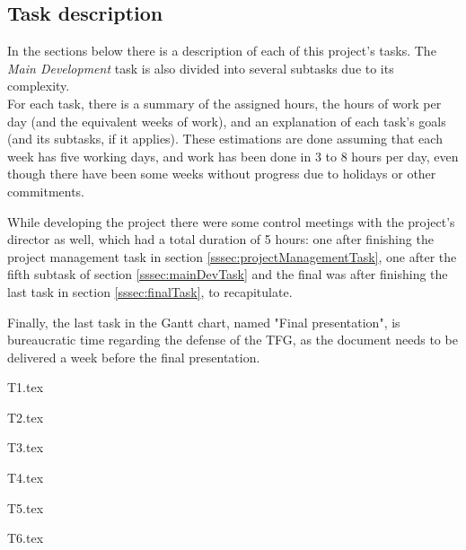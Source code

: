 \subsection{Task description}
\label{ssec:tasks}
In the sections below there is a description of each of this project's tasks. The \textit{Main Development} task is also divided into several subtasks due to its complexity.\\
For each task, there is a summary of the assigned hours, the hours of work per day (and the equivalent weeks of work), and an explanation of each task's goals (and its subtasks, if it applies). These estimations are done assuming that each week has five working days, and work has been done in 3 to 8 hours per day, even though there have been some weeks without progress due to holidays or other commitments.

While developing the project there were some control meetings with the project's director as well, which had a total duration of 5 hours: one after finishing the project management task in section \ref{sssec:projectManagementTask}, one after the fifth subtask of section \ref{sssec:mainDevTask} and the final was after finishing the last task in section \ref{sssec:finalTask}, to recapitulate. 

Finally, the last task in the Gantt chart, named "Final presentation", is bureaucratic time regarding the defense of the TFG, as the document needs to be delivered a week before the final presentation.

\pagebreak
{T1.tex}

\pagebreak
{T2.tex}

\pagebreak
{T3.tex}

\pagebreak
{T4.tex}

\pagebreak
{T5.tex}

{T6.tex}